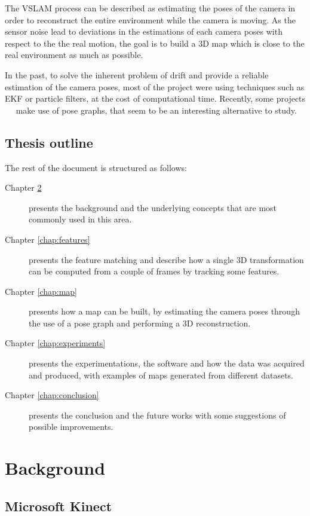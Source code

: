 The \gls{VSLAM} process can be described as estimating the poses of the camera in order to reconstruct the entire environment while the camera is moving. As the sensor noise lead to deviations in the estimations of each camera poses with respect to the the real motion, the goal is to build a 3D map which is close to the real environment as much as possible.

In the past, to solve the inherent problem of drift and provide a reliable estimation of the camera poses, most of the project were using techniques such as \gls{EKF} or particle filters, at the cost of computational time. Recently, some projects ~\cite{Intel_RGBD_2010}~\cite{engelhard11euron-workshop} make use of pose graphs, that seem to be an interesting alternative to study.

\section{Thesis outline}

The rest of the document is structured as follows:
\begin{description}
\item[Chapter \ref{chap:background}] presents the background and the underlying concepts that are most commonly used in this area.
\item[Chapter \ref{chap:features}] presents the feature matching and describe how a single 3D transformation can be computed  from a couple of frames by tracking some features.
\item[Chapter \ref{chap:map}] presents how a map can be built, by estimating the camera poses through the use of a pose graph and performing a 3D reconstruction.
\item[Chapter \ref{chap:experiments}] presents the experimentations, the software and how the data was acquired and produced, with examples of maps generated from different datasets.
\item[Chapter \ref{chap:conclusion}] presents the conclusion and the future works with some suggestions of possible improvements.
\end{description}

\chapter{Background}
\label{chap:background}

\section{Microsoft Kinect}

